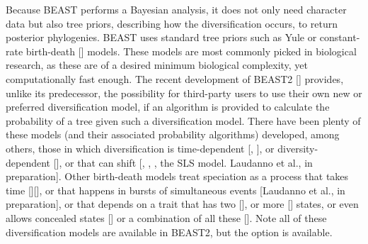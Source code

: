 \documentclass{article}
\begin{document}
Because BEAST performs a Bayesian analysis, 
it does not only need character data but also tree priors, 
describing how the diversification occurs, to return posterior phylogenies.
BEAST uses standard tree priors such as Yule or 
constant-rate birth-death [\cite{nee1994reconstructed}] models.
These models are most commonly picked in biological research,
as these are of a desired minimum biological complexity, 
yet computationally fast enough.
The recent development of BEAST2 [\cite{bouckaert2014beast}] provides, 
unlike its predecessor, the possibility for third-party users 
to use their own new or preferred diversification model, 
if an algorithm is provided to calculate the probability 
of a tree given such a diversification model.
There have been plenty of these models (and their associated probability algorithms) 
developed, among others, those in which diversification is 
time-dependent [\cite{nee1994reconstructed}, \cite{rabosky2008explosive}], 
or diversity-dependent [\cite{etienne2011diversity}],
or that can shift [\cite{etienne2012conceptual}, \cite{rabosky2014automatic}, \cite{alfaro2009nine}, the SLS model. Laudanno et al., in preparation].
Other birth-death models treat speciation as a process that takes time [\cite{rosindell2010protracted}][\cite{etienne2012prolonging}], or that happens in bursts of simultaneous events [Laudanno et al., in preparation], or that
depends on a trait that has two [\cite{maddison2007estimating}], 
or more [\cite{fitzjohn2012diversitree}] states,
or even allows concealed states [\cite{beaulieu2016detecting}] 
or a combination of all these [\cite{herrera2018detecting}].
Note all of these diversification models are available in BEAST2, 
but the option is available.
\end{document}
